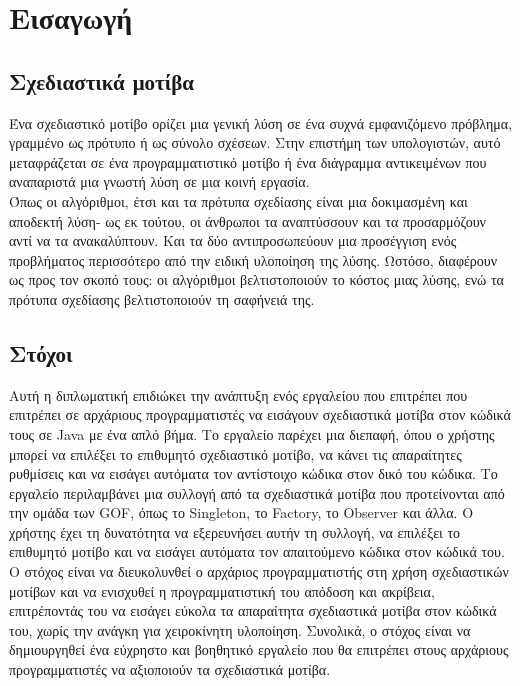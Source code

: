 \chapter{Εισαγωγή}
\label{ch:Introduction}
\section{Σχεδιαστικά μοτίβα}
\label{sec:patterns}
Ένα σχεδιαστικό μοτίβο ορίζει μια γενική λύση σε ένα συχνά εμφανιζόμενο πρόβλημα, γραμμένο
ως πρότυπο ή ως σύνολο σχέσεων. Στην επιστήμη των υπολογιστών, αυτό μεταφράζεται σε ένα
προγραμματιστικό μοτίβο ή ένα διάγραμμα αντικειμένων που αναπαριστά μια γνωστή λύση σε μια
κοινή εργασία. \\
Όπως οι αλγόριθμοι, έτσι και τα πρότυπα σχεδίασης είναι μια δοκιμασμένη και αποδεκτή λύση-
ως εκ τούτου, οι άνθρωποι τα αναπτύσσουν και τα προσαρμόζουν αντί να τα ανακαλύπτουν.
Και τα δύο αντιπροσωπεύουν μια προσέγγιση ενός προβλήματος περισσότερο από την ειδική
υλοποίηση της λύσης. Ωστόσο, διαφέρουν ως προς τον σκοπό τους: οι αλγόριθμοι βελτιστοποιούν
το κόστος μιας λύσης, ενώ τα πρότυπα σχεδίασης βελτιστοποιούν τη σαφήνειά της.
\section{Στόχοι}
\label{sec:Objectives}
Αυτή η διπλωματική επιδιώκει την ανάπτυξη ενός εργαλείου που επιτρέπει που επιτρέπει σε αρχάριους προγραμματιστές να εισάγουν 
σχεδιαστικά μοτίβα στον κώδικά τους σε Java με ένα απλό βήμα. Το εργαλείο παρέχει μια διεπαφή, όπου ο χρήστης μπορεί να 
επιλέξει το επιθυμητό σχεδιαστικό μοτίβο, να κάνει τις απαραίτητες ρυθμίσεις και να εισάγει αυτόματα τον αντίστοιχο 
κώδικα στον δικό του κώδικα. Το εργαλείο περιλαμβάνει μια συλλογή από τα σχεδιαστικά μοτίβα που προτείνονται από την ομάδα των GOF\textsubscript{\cite{GoF}}, 
όπως το Singleton, το Factory, το Observer και άλλα. Ο χρήστης έχει τη δυνατότητα να εξερευνήσει αυτήν τη συλλογή, 
να επιλέξει το επιθυμητό μοτίβο και να εισάγει αυτόματα τον απαιτούμενο κώδικα στον κώδικά του. Ο στόχος είναι να διευκολυνθεί 
ο αρχάριος προγραμματιστής στη χρήση σχεδιαστικών μοτίβων και να ενισχυθεί η προγραμματιστική του απόδοση και ακρίβεια, 
επιτρέποντάς του να εισάγει εύκολα τα απαραίτητα σχεδιαστικά μοτίβα στον κώδικά του, χωρίς την ανάγκη για χειροκίνητη υλοποίηση. 
Συνολικά, ο στόχος είναι να δημιουργηθεί ένα εύχρηστο και βοηθητικό εργαλείο που θα επιτρέπει στους αρχάριους προγραμματιστές 
να αξιοποιούν τα σχεδιαστικά μοτίβα.

